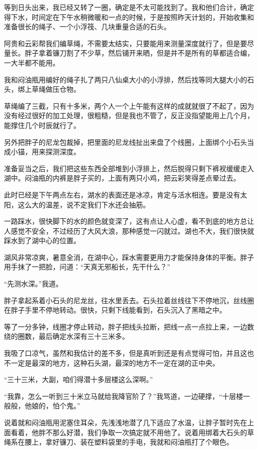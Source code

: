 等到日头出来，我已经又转了一圈，确定是不太可能找到了。我和他们合计，确定得下水，时间定在下午水稍微暖和一点的时候，于是按照昨天计划的，开始收集和准备很长的绳子、一个小浮筏、几块重量合适的石头。

阿贵和云彩帮我们编草绳，不需要太结实，只要能用来测量深度就行了，但是要尽量长。胖子拿着镰刀割了不少草，然后铺开来晒，但是并不是所有的草都适合编，一大半都不能用。

我和闷油瓶用编好的绳子扎了两只八仙桌大小的小浮排，然后找等同大腿大小的石头，绑上草绳做压仓物。

草绳编了三截，只有十多米，两个人一个上午能有这样的成就就很了不起了，因为没有经过很好的加工处理，很粗糙，但是我也不管了，反正没指望能用上几个月，能撑住几个时辰就行了。

另外把胖子的尼龙包裁掉，把里面的尼龙线扯出来盘了个线圈，上面绑个小石头当成小锚，用来探测深度。

准备妥当之后，我们把这些东西全部堆到小浮排上，然后脱得只剩下裤衩缓缓走入湖中。闷油瓶的内裤是胖子买的，上面有两只小鸡，把云彩笑得差点晕过去。

此时已经是下午两点左右，湖水的表面还是冰凉，肯定与活水相连。要是没有太阳，这么大的温差，说不定我们下水还会抽筋。

一路踩水，很快脚下的水的颜色就变深了，这有点让人心虚，看不到底的地方总让人感觉不安全，不过经历了大风大浪，那种感觉一闪就过。湖也不大，我们很快就踩水到了湖中心的位置。

湖风非常凉爽，暑意全消，在湖中心，踩水需要更用力才能保持身体的平衡。胖子用手抹了一把脸，问道：“天真无邪船长，先干什么？”

“先测水深。”我道。

胖子拿起系着小石头的尼龙丝，往水里丢去。石头拉着丝线往下不停地沉，丝线圈在胖子手里不停地转动。很快，只剩下线能看到，石头沉入了黑暗之中。

等了一分多钟，线圈才停止转动，胖子把线头拉断，把线一点一点拉上来，一边数绕的圈数，最后确定水深有三十三米多。

我吸了口凉气，虽然和我估计的差不多，但是真听到还是有点觉得可怕，并且这也不一定是最深的地方，这种石头湖，最深的地方不一定在湖的正中央。

“三十三米，大副，咱们得潜十多层楼这么深啊。”

“我靠，怎么一听到三十米立马就给我降官阶了？”我骂道，一边硬撑，“十层楼一般般，他娘的，怕个鬼。”

说着就和闷油瓶用泥塞住耳朵，先浅浅地潜了几下适应了水温，让胖子暂时先在上面看着，他胖不那么好潜，我们争取一次搞定就不用他了。说着用绑着大石头的草绳系在腰上，拿好镰刀、装在塑料袋里的手电，我就和闷油瓶打了个眼色。

